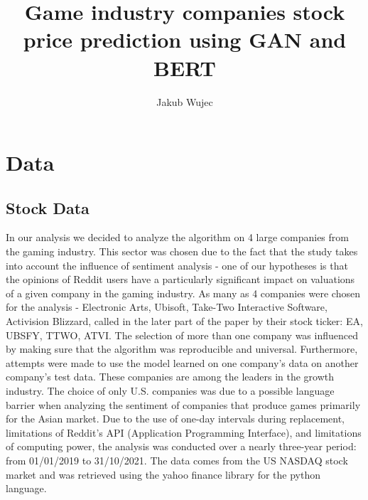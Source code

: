 \documentclass[11pt]{article} %
\title{Game industry companies stock price prediction using GAN and BERT}
\author{Jakub Wujec}
\begin{document}
\maketitle

\section{Data}
\subsection{Stock Data}
In our analysis we decided to analyze the algorithm on 4 large companies from the gaming industry. This sector was chosen due to the fact that the study takes into account the influence of sentiment analysis - one of our hypotheses is that the opinions of Reddit users have a particularly significant impact on valuations of a given company in the gaming industry. As many as 4 companies were chosen for the analysis - Electronic Arts, Ubisoft, Take-Two Interactive Software, Activision Blizzard, called in the later part of the paper by their stock ticker: EA, UBSFY, TTWO, ATVI.  The selection of more than one company was influenced by making sure that the algorithm was reproducible and universal. Furthermore, attempts were made to use the model learned on one company's data on another company's test data. These companies are among the leaders in the growth industry. The choice of only U.S. companies was due to a possible language barrier when analyzing the sentiment of companies that produce games primarily for the Asian market. Due to the use of one-day intervals during replacement, limitations of Reddit's API (Application Programming Interface), and limitations of computing power, the analysis was conducted over a nearly three-year period: from 01/01/2019 to 31/10/2021. The data comes from the US NASDAQ stock market and was retrieved using the yahoo finance library for the python language. 
\end{document}
